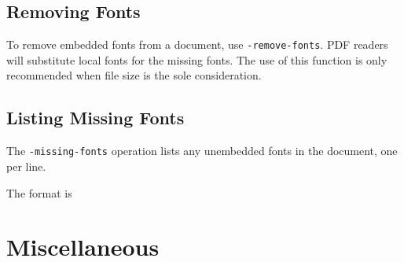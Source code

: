 \documentclass{book}
\begin{document}
\section{Removing Fonts}
\label{removefont}

To remove embedded fonts from a document, use \verb!-remove-fonts!. PDF readers will
substitute local fonts for the missing fonts. The use of this function is only
recommended when file size is the sole consideration.

\noindent{}

\section{Listing Missing Fonts}
  The \verb!-missing-fonts! operation lists any unembedded fonts in the document, one per line.

\noindent{}

  \noindent The format is

\noindent{}

\label{listmisingfonts}



\chapter{Miscellaneous}
\end{document}
